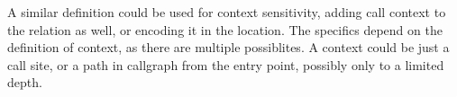 A similar definition could be used for context sensitivity, adding call context
to the relation as well, or encoding it in the location. The specifics depend on
the definition of context, as there are multiple possiblites. A context could be
just a call site, or a path in callgraph from the entry point, possibly only to
a limited depth.

%
%
%
%
%
%


